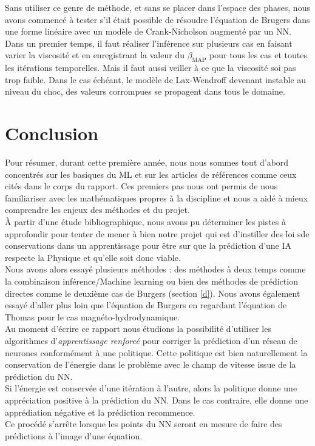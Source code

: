 \documentclass[a4paper,12pt]{article}
\newcommand{\bmap}{\beta_{\text{MAP}}}
\newcommand\bk{\color{black}}
\newcommand\navy{\color{navy}}
\numberwithin{equation}{section} %
\begin{document}
\noindent Sans utiliser ce genre de méthode, et sans se placer dans l'espace des phases, nous avons commencé à tester s'il était possible de résoudre l'équation de Brugers dans une forme linéaire avec un modèle de Crank-Nicholson augmenté par un NN.\\
Dans un premier temps, il faut réaliser l'inférence sur plusieurs cas en faisant varier la viscosité et en enregistrant la valeur du $\bmap$ pour tous les cas et toutes les itérations temporelles. Mais il faut aussi veiller à ce que la viscosité soi pas trop faible. Dans le cas échéant, le modèle de Lax-Wendroff devenant instable au niveau du choc, des valeurs corrompues se propagent dans tous le domaine.\\

\pagebreak

\navy \section{Conclusion} \bk
\noindent Pour résumer, durant cette première année, nous nous sommes tout d'abord concentrés sur les basiques du ML et sur les articles de références comme ceux cités dans le corps du rapport. Ces premiers pas nous ont permis de nous familiariser avec les mathématiques propres à la discipline et nous a aidé à mieux comprendre les enjeux des méthodes et du projet.\\
À partir d'une étude bibliographique, nous avons pu déterminer les pistes à approfondir pour tenter de mener à bien notre projet qui est d'instiller des loi sde conservations dans un apprentissage pour être sur que la prédiction d'une IA respecte la Physique et qu'elle soit donc viable.\\
Nous avons alors essayé plusieurs méthodes : des méthodes à deux temps comme la combinaison inférence/Machine learning ou bien des méthodes de prédiction directes comme le deuxième cas de Burgers (section \eqref{d}). Nous avons également essayé d'aller plus loin que l'équation de Burgers en regardant l'équation de Thomas pour le cas magnéto-hydrodynamique.\\

\noindent Au moment d'écrire ce rapport nous étudions la possibilité d'utiliser les algorithmes d'\textit{apprentissage renforcé} pour corriger la prédiction d'un réseau de neurones conformément à une politique. Cette politique est bien naturellement la conservation de l'énergie dans le problème avec le champ de vitesse issue de la prédiction du NN. \\
Si l'énergie est conservée d'une itération à l'autre, alors la politique donne une appréciation positive à la prédiction du NN. Dans le cas contraire, elle donne une apprédiation négative et la prédiction recommence.\\
Ce procédé s'arrête lorsque les points du NN seront en mesure de faire des prédictions à l'image d'une équation.\\




\pagebreak



\end{document}
